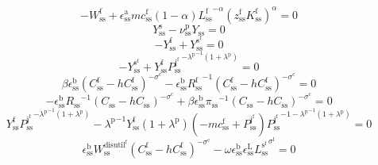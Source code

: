 \begin{equation}
-W^{\mathrm{f}}_\mathrm{ss} + {\epsilon^{\mathrm{a}}_\mathrm{ss}} {{m\!c}^{\mathrm{f}}_\mathrm{ss}} \left(1 - \alpha\right) {{L^{\mathrm{f}}_\mathrm{ss}}^{-\alpha}} {\left({z^{\mathrm{f}}_\mathrm{ss}} {K^{\mathrm{f}}_\mathrm{ss}}\right)^{\alpha}} = 0
\end{equation}
\begin{equation}
Y^{\mathrm{s}}_\mathrm{ss} - {\nu^{\mathrm{p}}_\mathrm{ss}} {Y_\mathrm{ss}} = 0
\end{equation}
\begin{equation}
-Y^{\mathrm{f}}_\mathrm{ss} + Y^{\mathrm{s}^{\mathrm{f}}}_\mathrm{ss} = 0
\end{equation}
\begin{equation}
-Y^{\mathrm{s}^{\mathrm{f}}}_\mathrm{ss} + {Y^{\mathrm{f}}_\mathrm{ss}} {{P^{\mathrm{j}^{\mathrm{f}}}_\mathrm{ss}}^{-{\lambda^{\mathrm{p}}}^{-1} \left(1 + \lambda^{\mathrm{p}}\right)}} = 0
\end{equation}
\begin{equation}
{\beta} {\epsilon^{\mathrm{b}}_\mathrm{ss}} {\left(C^{\mathrm{f}}_\mathrm{ss} - {h} {C^{\mathrm{f}}_\mathrm{ss}}\right)^{-\sigma^{\mathrm{c}}}} - {\epsilon^{\mathrm{b}}_\mathrm{ss}} {R^{\mathrm{f}}_\mathrm{ss}}^{-1} {\left(C^{\mathrm{f}}_\mathrm{ss} - {h} {C^{\mathrm{f}}_\mathrm{ss}}\right)^{-\sigma^{\mathrm{c}}}} = 0
\end{equation}
\begin{equation}
-{\epsilon^{\mathrm{b}}_\mathrm{ss}} {R_\mathrm{ss}}^{-1} {\left(C_\mathrm{ss} - {h} {C_\mathrm{ss}}\right)^{-\sigma^{\mathrm{c}}}} + {\beta} {\epsilon^{\mathrm{b}}_\mathrm{ss}} {\pi_\mathrm{ss}}^{-1} {\left(C_\mathrm{ss} - {h} {C_\mathrm{ss}}\right)^{-\sigma^{\mathrm{c}}}} = 0
\end{equation}
\begin{equation}
{Y^{\mathrm{f}}_\mathrm{ss}} {{P^{\mathrm{j}^{\mathrm{f}}}_\mathrm{ss}}^{-{\lambda^{\mathrm{p}}}^{-1} \left(1 + \lambda^{\mathrm{p}}\right)}} - {\lambda^{\mathrm{p}}}^{-1} {Y^{\mathrm{f}}_\mathrm{ss}} \left(1 + \lambda^{\mathrm{p}}\right) \left(-{m\!c}^{\mathrm{f}}_\mathrm{ss} + P^{\mathrm{j}^{\mathrm{f}}}_\mathrm{ss}\right) {{P^{\mathrm{j}^{\mathrm{f}}}_\mathrm{ss}}^{-1 - {\lambda^{\mathrm{p}}}^{-1} \left(1 + \lambda^{\mathrm{p}}\right)}} = 0
\end{equation}
\begin{equation}
{\epsilon^{\mathrm{b}}_\mathrm{ss}} {W^{\mathrm{disutil}^{\mathrm{f}}}_\mathrm{ss}} {\left(C^{\mathrm{f}}_\mathrm{ss} - {h} {C^{\mathrm{f}}_\mathrm{ss}}\right)^{-\sigma^{\mathrm{c}}}} - {\omega} {\epsilon^{\mathrm{b}}_\mathrm{ss}} {\epsilon^{\mathrm{L}}_\mathrm{ss}} {{L^{\mathrm{s}^{\mathrm{f}}}_\mathrm{ss}}^{\sigma^{\mathrm{l}}}} = 0
\end{equation}
